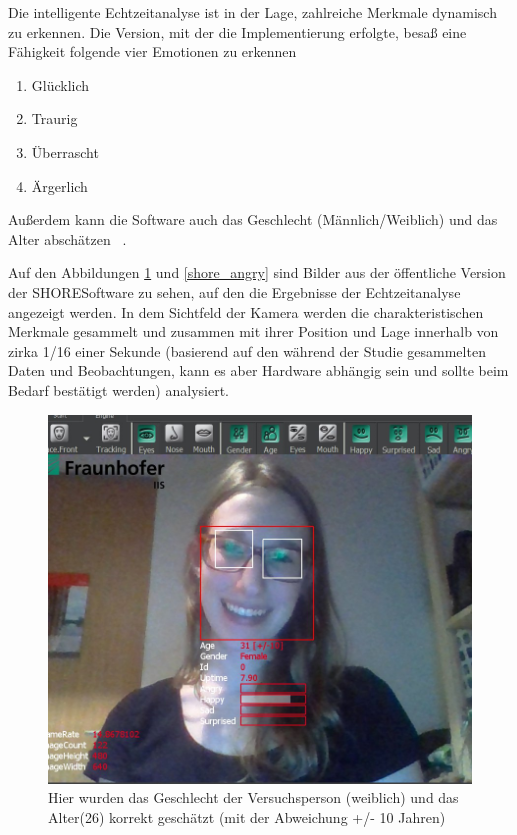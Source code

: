 Die intelligente Echtzeitanalyse ist in der Lage, zahlreiche Merkmale dynamisch zu erkennen. Die Version, mit der die Implementierung erfolgte, besaß eine Fähigkeit folgende vier Emotionen zu erkennen
\begin{enumerate}
    \item Glücklich
    \item Traurig
    \item Überrascht
    \item Ärgerlich
\end{enumerate}

Außerdem kann die Software auch das Geschlecht (Männlich/Weiblich) und das Alter abschätzen~\cite{Kueblbeck} .

Auf den Abbildungen \ref{shore_happy} und \ref{shore_angry} sind Bilder aus der öffentliche Version der SHORE\re Software zu sehen, auf den die Ergebnisse der Echtzeitanalyse angezeigt werden. 
In dem Sichtfeld der Kamera werden die charakteristischen Merkmale gesammelt und zusammen mit ihrer Position und Lage innerhalb von zirka 1/16 einer Sekunde (basierend auf den während der Studie gesammelten Daten und Beobachtungen, kann es aber Hardware abhängig sein und sollte beim Bedarf bestätigt werden) analysiert.

\begin{figure}[!ht]
\centering\includegraphics[width=330pt]{texes/shore_happy.png}
\caption{Hier wurden das Geschlecht der Versuchsperson (weiblich) und das Alter(26) korrekt geschätzt (mit der Abweichung +/- 10 Jahren)}
\label{shore_happy}
\end{figure}


